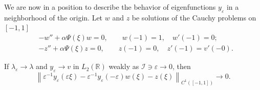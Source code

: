 \documentclass[11pt,english]{amsart}%
\begin{document}
We are now in a position to describe the behavior of  eigenfunctions $y_\varepsilon$ in a neighborhood of the origin. Let $w$ and $z$ be solutions of the Cauchy problems on $[-1,1]$
\begin{align}\label{CauchyProblemW}
   & -w''+\alpha\Psi(\xi) w=0,\qquad w(-1)=1, \quad  w'(-1)=0;\\ \label{CauchyProblemZ}
   & -z''+\alpha\Psi(\xi) z=0,\qquad     z(-1)=0,\quad     z'(-1)=v'(-0).
\end{align}


\begin{g_lemma}\label{LemmaLocalConvergence} If $\lambda_\varepsilon\to \lambda$ and $y_\varepsilon \to v$ in $L_2(\mathbb{R})$ weakly as $\mathcal{I}\ni \varepsilon\to 0$, then
  \begin{equation}\label{YeWZ}
  \left\|\varepsilon^{-1}y_\varepsilon(\varepsilon\xi)-\varepsilon^{-1}y_\varepsilon(-\varepsilon)w(\xi)- z(\xi)\right\|_{C^1([-1,1])}\to 0.
  \end{equation}
\end{g_lemma}
\end{document}
